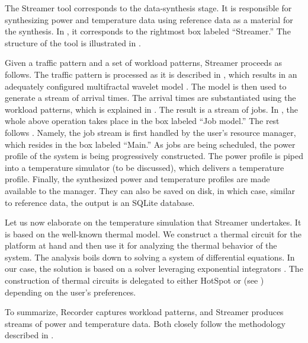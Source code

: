 
The Streamer tool corresponds to the data-synthesis stage. It is responsible for
synthesizing power and temperature data using reference data as a material for
the synthesis. In , it corresponds to the rightmost box
labeled ``Streamer.'' The structure of the tool is illustrated in
.

Given a traffic pattern and a set of workload patterns, Streamer proceeds as
follows. The traffic pattern is processed as it is described in ,
which results in an adequately configured multifractal wavelet model
\cite{riedi1999}. The model is then used to generate a stream of arrival times.
The arrival times are substantiated using the workload patterns, which is
explained in . The result is a stream of jobs. In
, the whole above operation takes place in the box labeled ``Job
model.'' The rest follows . Namely, the job stream is first
handled by the user's resource manager, which resides in the box labeled
``Main.'' As jobs are being scheduled, the power profile of the system is being
progressively constructed. The power profile is piped into a temperature
simulator (to be discussed), which delivers a temperature profile. Finally, the
synthesized power and temperature profiles are made available to the manager.
They can also be saved on disk, in which case, similar to reference data, the
output is an SQLite database.

Let us now elaborate on the temperature simulation that Streamer undertakes. It
is based on the well-known thermal  model. We construct a thermal 
circuit for the platform at hand and then use it for analyzing the thermal
behavior of the system. The analysis boils down to solving a system of
differential equations. In our case, the solution is based on a solver
leveraging exponential integrators \cite{ukhov2014}. The construction of thermal
circuits is delegated to either HotSpot \cite{skadron2004} or 
\cite{sridhar2010} (see ) depending on the user's preferences.

To summarize, Recorder captures workload patterns, and Streamer produces streams
of power and temperature data. Both closely follow the methodology described in
.
